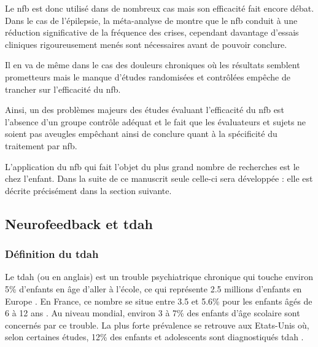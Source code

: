 Le \gls{nfb} est donc utilisé dans de nombreux cas mais son efficacité fait encore débat. Dans le cas de l'épilepsie, la méta-analyse de \citet{Tan2009}
montre que le \gls{nfb} conduit à une réduction significative de la fréquence des crises, cependant davantage d'essais cliniques
rigoureusement menés sont nécessaires avant de pouvoir conclure. 

Il en va de même dans le cas des douleurs chroniques où les résultats semblent prometteurs \citep{Mayaud2019} mais le manque d'études randomisées et
contrôlées empêche de
trancher sur l'efficacité du \gls{nfb}.

Ainsi, un des problèmes majeurs des études évaluant l'efficacité du \gls{nfb} est l'absence d'un groupe contrôle adéquat et le fait que les évaluateurs et sujets
ne soient pas aveugles \citep{Thibault2017, Thibault2017climate, Jeunet2018} empêchant ainsi de conclure quant à la spécificité du traitement par \gls{nfb}.

L'application du \gls{nfb} qui fait l'objet du plus grand nombre de recherches est le  chez l'enfant. Dans la suite de ce manuscrit seule 
celle-ci sera développée : elle est décrite précisément dans la section suivante.

\subsection{Neurofeedback et \gls{tdah}} \label{nfb_and_adhd}

\subsubsection{Définition du \gls{tdah}}

Le \gls{tdah} (ou  en anglais) est un trouble psychiatrique chronique qui touche environ 5\% d'enfants en âge d'aller à l'école, 
ce qui représente 2.5 millions d'enfants en Europe \citep{DSM-5}. En France, ce nombre se situe entre 3.5 et 5.6\% pour les enfants âgés de 6 à 12 ans \citep{Lecendreux2011}. 
Au niveau mondial, environ 3 à 7\% des enfants d'âge scolaire sont concernés par ce trouble. La plus forte prévalence se retrouve aux Etats-Unis où, selon certaines
études, 12\% des enfants et adolescents
sont diagnostiqués \gls{tdah} \citep{Collins2016}.


